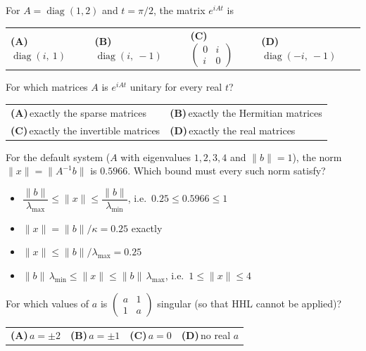 \documentclass[11pt,a4paper]{article}
\newcommand{\optlabel}[1]{\textbf{(#1)}}
\newenvironment{qitem}[1]{\begin{list}{}{\setlength{\leftmargin}{3.3em}\setlength{\labelwidth}{3.1em}%
  \setlength{\labelsep}{0.2em}\setlength{\topsep}{3pt}\setlength{\parsep}{3pt}}\item[\textbf{Q.#1}\hfill]}{\end{list}}
\newcommand{\qsep}{\par\vspace{2pt}{\color{black!15}\hrule}\vspace{4pt}}
\begin{document}
\begin{qitem}{16}
For $A = \operatorname{diag}(1, 2)$ and $t = \pi/2$, the matrix $e^{iAt}$ is
\par\smallskip\noindent\begin{tabularx}{\linewidth}{@{}*{4}{L}@{}}
\optlabel{A}\,$\operatorname{diag}(i,\ 1)$ & \optlabel{B}\,$\operatorname{diag}(i,\ -1)$ & \optlabel{C}\,$\begin{pmatrix}0 & i\\ i & 0\end{pmatrix}$ & \optlabel{D}\,$\operatorname{diag}(-i,\ -1)$
\end{tabularx}
\end{qitem}
\qsep

\begin{qitem}{17}
For which matrices $A$ is $e^{iAt}$ unitary for every real $t$?
\par\smallskip\noindent\begin{tabularx}{\linewidth}{@{}*{2}{L}@{}}
\optlabel{A}\,exactly the sparse matrices & \optlabel{B}\,exactly the Hermitian matrices \\[3pt]
\optlabel{C}\,exactly the invertible matrices & \optlabel{D}\,exactly the real matrices
\end{tabularx}
\end{qitem}
\qsep

\begin{qitem}{18}
For the default system ($A$ with eigenvalues $1, 2, 3, 4$ and $\|b\| = 1$), the norm $\|x\| = \|A^{-1}b\|$ is $0.5966$. Which bound must every such norm satisfy?
\begin{itemize}[leftmargin=2.6em, labelsep=0.4em, itemsep=2pt, topsep=3pt]
\item[\optlabel{A}] $\dfrac{\|b\|}{\lambda_{\max}} \le \|x\| \le \dfrac{\|b\|}{\lambda_{\min}}$, i.e.\ $0.25 \le 0.5966 \le 1$
\item[\optlabel{B}] $\|x\| = \|b\|/\kappa = 0.25$ exactly
\item[\optlabel{C}] $\|x\| \le \|b\|/\lambda_{\max} = 0.25$
\item[\optlabel{D}] $\|b\|\,\lambda_{\min} \le \|x\| \le \|b\|\,\lambda_{\max}$, i.e.\ $1 \le \|x\| \le 4$
\end{itemize}
\end{qitem}
\qsep

\begin{qitem}{19}
For which values of $a$ is $\begin{pmatrix}a & 1\\ 1 & a\end{pmatrix}$ singular (so that HHL cannot be applied)?
\par\smallskip\noindent\begin{tabularx}{\linewidth}{@{}*{4}{L}@{}}
\optlabel{A}\,$a = \pm2$ & \optlabel{B}\,$a = \pm1$ & \optlabel{C}\,$a = 0$ & \optlabel{D}\,no real $a$
\end{tabularx}
\end{qitem}
\qsep
\end{document}
